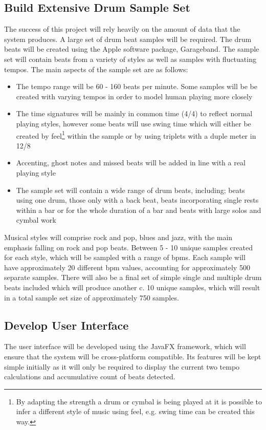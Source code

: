 \documentclass[a4paper, 11pt]{article}
\begin{document}
\subsection{Build Extensive Drum Sample Set}
The success of this project will rely heavily on the amount of data that the system produces. A large set of drum beat samples will be required. The drum beats will be created using the Apple software package, Garageband. The sample set will contain beats from a variety of styles as well as samples with fluctuating tempos. The main aspects of the sample set are as follows:

\begin{itemize}
\item The tempo range will be 60 - 160 beats per minute. Some samples will be be created with varying tempos in order to model human playing more closely
\item The time signatures will be mainly in common time (4/4) to reflect normal playing styles, however some beats will use swing time which will either be created by feel\footnote{By adapting the strength a drum or cymbal is being played at it is possible to infer a different style of music using feel, e.g. swing time can be created this way.} within the sample or by using triplets with a duple meter in 12/8
\item Accenting, ghost notes and missed beats will be added in line with a real playing style
\item The sample set will contain a wide range of drum beats, including; beats using one drum, those only with a back beat, beats incorporating single rests within a bar or for the whole duration of a bar and beats with large solos and cymbal work
\end{itemize} 

Musical styles will comprise rock and pop, blues and jazz, with the main emphasis falling on rock and pop beats. Between 5 - 10 unique samples created for each style, which will be sampled with a range of bpms. Each sample will have approximately 20 different bpm values, accounting for approximately 500 separate samples. There will also be a final set of simple single and multiple drum beats included which will produce another c. 10 unique samples, which will result in a total sample set size of approximately 750 samples.

\subsection{Develop User Interface}
The user interface will be developed using the JavaFX framework, which will ensure that the system will be cross-platform compatible. Its features will be kept simple initially as it will only be required to display the current two tempo calculations and accumulative count of beats detected.
\end{document}
